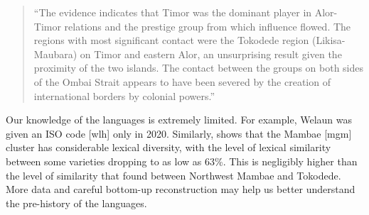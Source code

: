 \begin{quote}
		“The evidence indicates that Timor was the dominant player in
		Alor-Timor relations and the prestige group from which influence flowed.
		The regions with most significant contact were the Tokodede region
		(Likisa-Maubara) on Timor and eastern Alor, an unsurprising result given the proximity
		of the two islands.
		The contact between the groups on both sides of the Ombai Strait
		appears to have been severed by the creation of international
		borders by colonial powers.” \citep[112]{SchapperWellfelt2018} 
\end{quote}

Our knowledge of the  languages is extremely limited.
For example, Welaun was given an ISO code [wlh] only in 2020.
Similarly, \citet[75--93]{Fogaca2017} shows that the Mambae [mgm]
cluster has considerable lexical diversity,
with the level of lexical similarity between some varieties dropping
to as low as 63{\%}.
This is negligibly higher than the level of similarity that \citet[35]{Edwards2019}
found between Northwest Mambae and Tokodede.
More data and careful bottom-up reconstruction may help us better
understand the pre-history of the  languages.